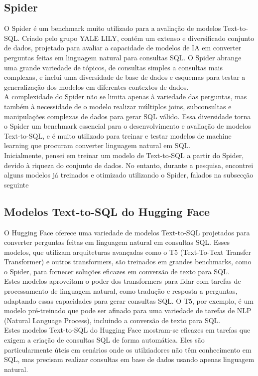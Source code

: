 \documentclass{article}
\begin{document}
\subsection{Spider \cite{spider2025}}

\hspace*{1em} O Spider é um benchmark muito utilizado para a avaliação de modelos Text-to-SQL. Criado pelo grupo YALE LILY, contém um extenso e diversificado conjunto de dados, projetado para avaliar a capacidade de modelos de IA em converter perguntas feitas em linguagem natural para consultas SQL. O Spider abrange uma grande variedade de tópicos, de consultas simples a consultas mais complexas, e inclui uma diversidade de base de dados e esquemas para testar a generalização dos modelos em diferentes contextos de dados. \\
\hspace*{1em} A complexidade do Spider não se limita apenas à variedade das perguntas, mas também à necessidade de o modelo realizar múltiplos joins, subconsultas e manipulações complexas de dados para gerar SQL válido. Essa diversidade torna o Spider um benchmark essencial para o desenvolvimento e avaliação de modelos Text-to-SQL, e é muito utilizado para treinar e testar modelos de machine learning que procuram converter linguagem natural em SQL.\\
\hspace*{1em} Inicialmente, pensei em treinar um modelo de Text-to-SQL a partir do Spider, devido à riqueza do conjunto de dados. No entanto, durante a pesquisa, encontrei alguns modelos já treinados e otimizado utilizando o Spider, falados na subsecção seguinte

\subsection{Modelos Text-to-SQL do Hugging Face \cite{huggingface}}

\hspace*{1em} O Hugging Face oferece uma variedade de modelos Text-to-SQL projetados para converter perguntas feitas em linguagem natural em consultas SQL. Esses modelos, que utilizam arquiteturas avançadas como o T5 (Text-To-Text Transfer Transformer) e outros transformers, são treinados em grandes benchmarks, como o Spider, para fornecer soluções eficazes em conversão de texto para SQL.\\
\hspace*{1em} Estes modelos aproveitam o poder dos transformers para lidar com tarefas de processamento de linguagem natural, como tradução e resposta a perguntas, adaptando essas capacidades para gerar consultas SQL. O T5, por exemplo, é um modelo pré-treinado que pode ser afinado para uma variedade de tarefas de NLP (Natural Language Process), incluindo a conversão de texto para SQL. \\
\hspace*{1em} Estes modelos Text-to-SQL do Hugging Face mostram-se eficazes em tarefas que exigem a criação de consultas SQL de forma automática. Eles são particularmente úteis em cenários onde os utilziadores não têm conhecimento em SQL, mas precisam realizar consultas em base de dados usando apenas linguagem natural.
\end{document}
